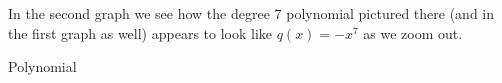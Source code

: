 \documentclass{ximera}
\begin{document}
In the second graph we see how the degree $7$ polynomial pictured there (and in the first graph as well) appears to look like $q(x) = -x^7$ as we zoom out.%


\begin{summary}
\item Polynomial
\end{summary}

 
%
\end{document}

